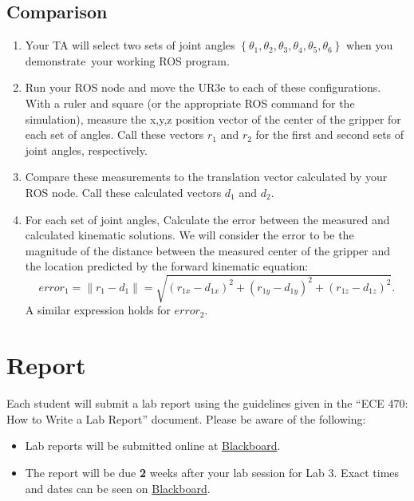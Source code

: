 \subsection{Comparison}
\begin{enumerate}
\item Your TA will select two sets of joint angles $\left\{\theta_1,\theta_2,\theta_3,\theta_4,\theta_5,\theta_6\right\}$ when you demonstrate\
your working ROS program.  
\item Run your ROS node and move the UR3e to each of these configurations.  With a ruler and square (or the appropriate ROS command for the simulation),  measure the x,y,z position vector of the center of the gripper for each set of angles.  Call these vectors $r_1$ and $r_2$ for the first and second sets of joint angles, respectively.

\item Compare these measurements to the translation vector calculated by your ROS node.  
Call these calculated vectors $d_1$ and $d_2$.	

\item For each set of joint angles, Calculate the error between the measured and calculated kinematic solutions.  We will consider the error to be the magnitude of the distance between the measured center of the gripper and the location predicted by the forward kinematic equation:
\[
error_1 = \left\| r_1 - d_1 \right\| = \sqrt{(r_{1x}-d_{1x})^2 + (r_{1y}-d_{1y})^2 + (r_{1z}-d_{1z})^2}.
\]
A similar expression holds for $error_2$.
\end{enumerate}


\section{Report}
Each student will submit a lab report using the guidelines given in the “ECE 470: How to Write a Lab Report” document.  Please be aware of the following:
\begin{itemize}
    \item Lab reports will be submitted online at \href{https://learn.intl.zju.edu.cn/}{Blackboard}.
    \item The report will be due \textbf{2} weeks after your lab session for Lab 3.  Exact times and dates can be seen on \href{https://learn.intl.zju.edu.cn/}{Blackboard}.
\end{itemize}


